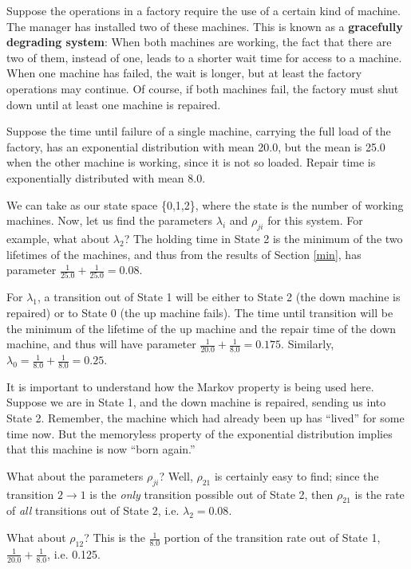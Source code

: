 \documentclass[11pt]{article}
\begin{document}
Suppose the operations in a factory require the use of a certain kind of
machine.  The manager has installed two of these machines. This is known
as a \textbf{gracefully degrading system}: When both machines are
working, the fact that there are two of them, instead of one, leads to a
shorter wait time for access to a machine.  When one machine has failed,
the wait is longer, but at least the factory operations may continue. Of
course, if both machines fail, the factory must shut down until at least
one machine is repaired.

Suppose the time until failure of a single machine, carrying the full load of
the factory, has an exponential distribution with mean 20.0, but the mean is
25.0 when the other machine is working, since it is not so loaded. Repair time
is exponentially distributed with mean 8.0.

We can take as our state space \{0,1,2\}, where the state is the number
of working machines. Now, let us find the parameters $\lambda_{i}$ and
$\rho_{ji}$ for this system. For example, what about $\lambda_{2}$?
The holding time in State 2 is the minimum of the two lifetimes of the
machines, and thus from the results of Section \ref{min}, has parameter
$\frac{1}{25.0}+\frac{1}{25.0}=0.08$. 

For $\lambda_{1}$, a transition out of State 1 will be either to State
2 (the down machine is repaired) or to State 0 (the up machine fails).
The time until transition will be the minimum of the lifetime of the up
machine and the repair time of the down machine, and thus will have
parameter $\frac{1}{20.0}+\frac{1}{8.0}=0.175$.  Similarly, $\lambda
_{0}=\frac{1}{8.0}+\frac{1}{8.0}=0.25$.

It is important to understand how the Markov property is being used
here. Suppose we are in State 1, and the down machine is repaired,
sending us into State 2.  Remember, the machine which had already been
up has ``lived'' for some time now. But the memoryless property of the
exponential distribution implies that this machine is now ``born
again.''

What about the parameters $\rho_{ji}$? Well, $\rho_{21}$ is certainly
easy to find; since the transition $2\rightarrow 1$ is the \textit{only}
transition possible out of State 2, then $\rho_{21}$ is the rate of
\textit{all} transitions out of State 2, i.e. $\lambda_{2}=0.08$.

What about $\rho_{12}$? This is the $\frac{1}{8.0}$ portion of the
transition rate out of State 1, $\frac{1}{20.0}+\frac{1}{8.0}$, i.e. 0.125.
\end{document}
